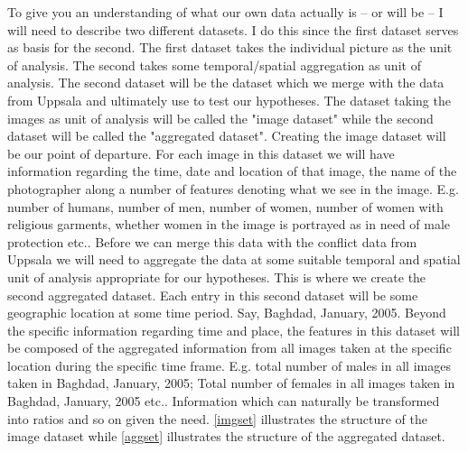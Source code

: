 \documentclass[a4paper]{article}
\begin{document}
To give you an understanding of what our own data actually is -- or will be -- I will need to describe two different datasets. I do this since the first dataset serves as basis for the second. The first dataset takes the individual picture as the unit of analysis. The second takes some temporal/spatial aggregation as unit of analysis. The second dataset will be the dataset which we merge with the data from Uppsala and ultimately use to test our hypotheses. The dataset taking the images as unit of analysis will be called the "image dataset" while the second dataset will be called the "aggregated dataset". Creating the image dataset will be our point of departure. For each image in this dataset we will have information regarding the time, date and location of that image, the name of the photographer along a number of features denoting what we see in the image. E.g. number of humans, number of men, number of women, number of women with religious garments, whether women in the image is portrayed as in need of male protection etc.. Before we can merge this data with the conflict data from Uppsala we will need to aggregate the data at some suitable temporal and spatial unit of analysis appropriate for our hypotheses. This is where we create the second aggregated dataset. Each entry in this second dataset will be some geographic location at some time period. Say, Baghdad, January, 2005. Beyond the specific information regarding time and place, the features in this dataset will be composed of the aggregated information from all images taken at the specific location during the specific time frame. E.g. total number of males in all images taken in Baghdad, January, 2005; Total number of females in all images taken in Baghdad, January, 2005 etc.. Information which can naturally be transformed into ratios and so on given the need. \autoref{imgset} illustrates the structure of the image dataset while \autoref{aggset} illustrates the structure of the aggregated dataset.\par
\end{document}
